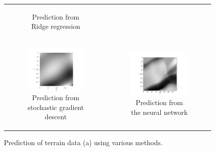 \begin{figure}[t]
\begin{tabular}{cc}
\begin{subfigure}[b]{0.37\textwidth}
            \caption{Prediction from Ridge regression}
            \label{fig:terrain1-ridge}
        \end{subfigure} \\
        \begin{subfigure}[b]{0.5\textwidth}
            \centering
            \includegraphics[width=\textwidth]{examples/tests_even/figs/gradient-descent-terrain-map.pdf}
            \caption{Prediction from stochastic gradient descent}
            \label{fig:terrain1-gd}
        \end{subfigure} &
        \begin{subfigure}[b]{0.5\textwidth}
            \centering
            \includegraphics[width=\textwidth]{examples/tests_even/figs/neural-network-terrain-map.pdf}
            \caption{Prediction from the neural network}
            \label{fig:terrain1-nn}
        \end{subfigure}
    \end{tabular}
    \caption{Prediction of terrain data (a) using various methods.}
    \label{fig:terrain-allfigs}
\end{figure}
\clearpage

